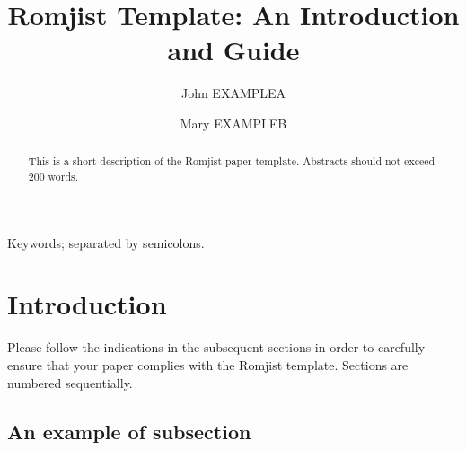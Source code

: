 \documentclass[twoside]{romjist}
\begin{document}
      

    
    \title{Romjist Template: An Introduction and Guide}%

    \author[1]{John \uppercase{Examplea}}%
    \author[2, *]{Mary \uppercase{Exampleb}}

    

    \maketitle
    
    \begin{abstract} This is a short description of the Romjist paper template. Abstracts should not exceed 200 words. \end{abstract}
    
    \begin{keywords} Keywords; separated by semicolons. \end{keywords}

\section{Introduction}

\hspace{0.5cm} Please follow the indications in the subsequent sections in order to carefully ensure that your paper complies with the Romjist template. Sections are numbered sequentially.

\subsection{An example of subsection}
\end{document}
